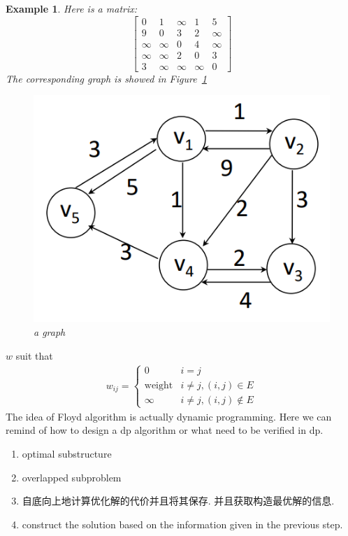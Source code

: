 \documentclass[a4paper, 10pt]{ctexart} %
\newtheorem{example}{Example}
\begin{document}
\begin{example}
Here is a matrix: 
\[
\begin{bmatrix}
     0 & 1 & \infty & 1 & 5\\ 
    9 &  0 & 3 & 2 & \infty \\
    \infty & \infty & 0 & 4 &\infty \\
    \infty & \infty & 2 & 0 & 3 \\
    3 & \infty & \infty & \infty & 0
\end{bmatrix}
\]
The corresponding graph is showed in Figure~\ref{fig:apsp1}
\begin{figure}
    \centering
    \includegraphics[scale = 0.5]{apsp1.png}
    \caption{a graph}
    \label{fig:apsp1}
\end{figure}
\end{example}
$w$ suit that 
\begin{align*}
    w_{ij} = 
    \begin{cases}
        0 & i =  j\\
        \text{weight} & i \ne j , \left( i , j\right) \in E\\
        \infty & i\ne j , \left( i , j\right) \notin E
    \end{cases}
\end{align*}
The idea of Floyd algorithm is actually dynamic programming. Here we can remind of 
how to design a dp algorithm or what need to be verified in dp.

\begin{enumerate}
    \item optimal substructure 
    \item overlapped subproblem
    \item 自底向上地计算优化解的代价并且将其保存. 并且获取构造最优解的信息.
    \item construct the solution based on the information given in the previous step.
\end{enumerate}
\end{document}
